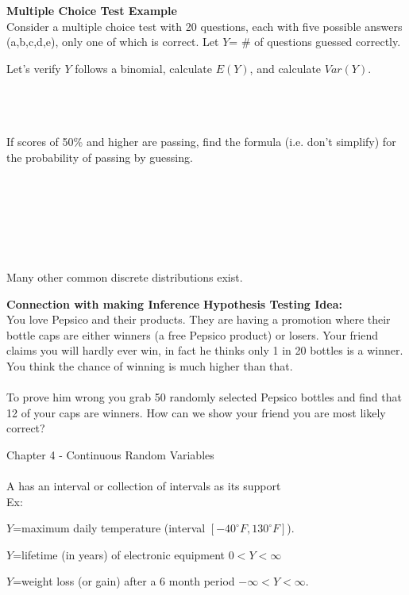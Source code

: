 \textbf{Multiple Choice Test Example}\\
Consider a multiple choice test with 20 questions, each with five possible answers (a,b,c,d,e), only one of which is correct. Let $Y$= \# of questions guessed correctly.
\be
\item Let's verify $Y$ follows a binomial, calculate $E(Y)$, and calculate $Var(Y)$.\\~\\~\\~\\
\item If scores of 50\% and higher are passing, find the formula (i.e. don't simplify) for the probability of passing by guessing.\\~\\~\\~\\~\\~\\~\\
\ee

Many other common discrete distributions exist.

\pagebreak

\textbf{Connection with making Inference}
\textbf{Hypothesis Testing Idea:} \\
You love Pepsico and their products.  They are having a promotion where their bottle caps are either winners (a free Pepsico product) or losers.  Your friend claims you will hardly ever win, in fact he thinks only 1 in 20 bottles is a winner.  You think the chance of winning is much higher than that.  \\~\\
To prove him wrong you grab 50 randomly selected Pepsico bottles and find that 12 of your caps are winners.  How can we show your friend you are most likely correct?

\pagebreak

\huge Chapter 4 - Continuous Random Variables\\\normalsize~\\
A \underbar{~~~~~~~~~~~~~~~~~~~~~~~~~~~~~~~~~~~} has an interval or collection of intervals as its support\\
Ex:
\bi
\item $Y$=maximum daily temperature (interval $[-40^\circ F, 130^\circ F]$).
\item $Y$=lifetime (in years) of electronic equipment $0 <Y <\infty$
\item $Y$=weight loss (or gain) after a 6 month period $-\infty < Y < \infty$.
\ei


